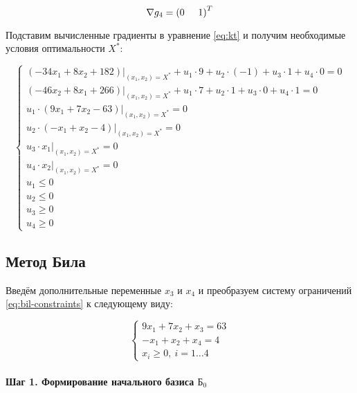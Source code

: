 \begin{equation*}
	\nabla g_4 = \left( 0 \hspace{5mm} 1 \right)^T
\end{equation*}

Подставим вычисленные градиенты в уравнение \ref{eq:kt} и получим необходимые условия оптимальности $X^*$:

\begin{equation*}
	\begin{cases}
		\left( -34 x_1 + 8 x_2 + 182 \right) \Big|_{(x_1, x_2) = X^*} + u_1 \cdot 9 + u_2 \cdot (-1) + u_3 \cdot 1 + u_4 \cdot 0 = 0
		\\
		\left( -46 x_2 + 8 x_1 + 266 \right) \Big|_{(x_1, x_2) = X^*} + u_1 \cdot 7 + u_2 \cdot 1 + u_3 \cdot 0 + u_4 \cdot 1 = 0
		\\
		u_1 \cdot (9 x_1 + 7 x_2 - 63) \Big|_{(x_1, x_2) = X^*} = 0
		\\
		u_2 \cdot (-x_1 + x_2 - 4) \Big|_{(x_1, x_2) = X^*} = 0
		\\
		u_3 \cdot x_1 \Big|_{(x_1, x_2) = X^*} = 0
		\\
		u_4 \cdot x_2 \Big|_{(x_1, x_2) = X^*} = 0
		\\
		u_1 \leq 0
		\\
		u_2 \leq 0
		\\
		u_3 \geq 0
		\\
		u_4 \geq 0\
	\end{cases}
\end{equation*}

\subsection{Метод Била}

Введём дополнительные переменные $x_3$ и $x_4$ и преобразуем систему ограничений \ref{eq:bil-constraints} к следующему виду:

\begin{equation*}
\begin{cases}
	9 x_1 + 7 x_2 + x_3 = 63
	\\
	- x_1 + x_2 + x_4 = 4
	\\
	x_i \geq 0,\ i = 1 \dots 4
\end{cases}
\end{equation*}

\paragraph{Шаг 1. Формирование начального базиса $\text{Б}_0$}

